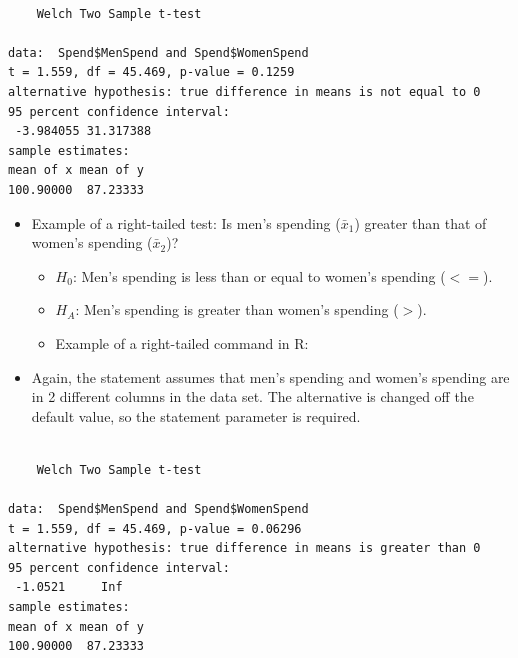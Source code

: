 \documentclass[
  letterpaper,
  DIV=11,
  numbers=noendperiod]{scrreprt}
\newenvironment{Shaded}{\begin{snugshade}}{\end{snugshade}}
\newcommand{\AttributeTok}[1]{\textcolor[rgb]{0.40,0.45,0.13}{#1}}
\newcommand{\FunctionTok}[1]{\textcolor[rgb]{0.28,0.35,0.67}{#1}}
\newcommand{\NormalTok}[1]{\textcolor[rgb]{0.00,0.23,0.31}{#1}}
\newcommand{\SpecialCharTok}[1]{\textcolor[rgb]{0.37,0.37,0.37}{#1}}
\newcommand{\StringTok}[1]{\textcolor[rgb]{0.13,0.47,0.30}{#1}}
\providecommand{\tightlist}{%
  \setlength{\itemsep}{0pt}\setlength{\parskip}{0pt}}\usepackage{longtable,booktabs,array}
\begin{document}
\begin{verbatim}

    Welch Two Sample t-test

data:  Spend$MenSpend and Spend$WomenSpend
t = 1.559, df = 45.469, p-value = 0.1259
alternative hypothesis: true difference in means is not equal to 0
95 percent confidence interval:
 -3.984055 31.317388
sample estimates:
mean of x mean of y 
100.90000  87.23333 
\end{verbatim}

\begin{itemize}
\tightlist
\item
  Example of a right-tailed test: Is men's spending (\(\bar{x}_1\))
  greater than that of women's spending (\(\bar{x}_2\))?

  \begin{itemize}
  \tightlist
  \item
    \(H_0\): Men's spending is less than or equal to women's spending
    (\(<=\)).
  \item
    \(H_A\): Men's spending is greater than women's spending (\(>\)).
  \item
    Example of a right-tailed command in R:
  \end{itemize}
\item
  Again, the statement assumes that men's spending and women's spending
  are in 2 different columns in the data set. The alternative is changed
  off the default value, so the statement parameter is required.
\end{itemize}

\begin{Shaded}
\end{Shaded}

\begin{verbatim}

    Welch Two Sample t-test

data:  Spend$MenSpend and Spend$WomenSpend
t = 1.559, df = 45.469, p-value = 0.06296
alternative hypothesis: true difference in means is greater than 0
95 percent confidence interval:
 -1.0521     Inf
sample estimates:
mean of x mean of y 
100.90000  87.23333 
\end{verbatim}
\end{document}
